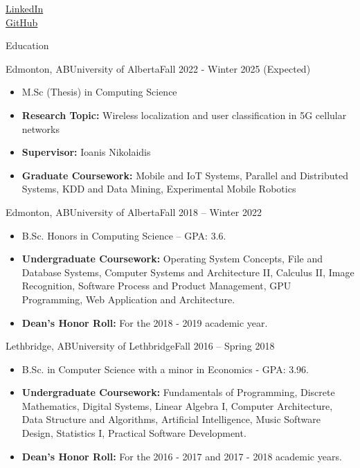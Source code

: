 \documentclass[]{mcdowellcv}
\begin{document}
\makeheader
\begin{flushright}
  \href{https://www.linkedin.com/in/jihoon-og-b938241a3/}{LinkedIn} \\
  \href{https://github.com/jihoonog}{GitHub}
\end{flushright}

\begin{cvsection}{Education}
  \begin{cvsubsection}{Edmonton, AB}{University of Alberta}{Fall 2022 - Winter 2025 (Expected)}
    \begin{itemize}
      \item M.Sc (Thesis) in Computing Science
      \item \textbf{Research Topic:} Wireless localization and user classification in 5G cellular networks
      \item \textbf{Supervisor:} Ioanis Nikolaidis 
      \item \textbf{Graduate Coursework:} Mobile and IoT Systems, Parallel and Distributed Systems, KDD and Data Mining, Experimental Mobile Robotics
    \end{itemize}
  \end{cvsubsection}
  \begin{cvsubsection}{Edmonton, AB}{University of Alberta}{Fall 2018 -- Winter 2022}
    \begin{itemize}
      \item B.Sc. Honors in Computing Science -- GPA: 3.6.
      \item \textbf{Undergraduate Coursework:} Operating System Concepts, File and Database Systems,
        Computer Systems and Architecture II, Calculus II, Image Recognition, Software Process and Product Management, GPU Programming,
        Web Application and Architecture.
      \item \textbf{Dean's Honor Roll:} For the 2018 - 2019 academic year. 
    \end{itemize}
  \end{cvsubsection}

  \begin{cvsubsection}{Lethbridge, AB}{University of Lethbridge}{Fall 2016 -- Spring 2018}
    \begin{itemize}   
      \item B.Sc. in Computer Science with a minor in Economics - GPA: 3.96.
      \item \textbf{Undergraduate Coursework:} Fundamentals of Programming, Discrete Mathematics, 
        Digital Systems, Linear Algebra I, Computer Architecture, Data Structure and Algorithms, 
        Artificial Intelligence, Music Software Design, Statistics I, Practical Software Development.
      \item \textbf{Dean's Honor Roll:} For the 2016 - 2017 and 2017 - 2018 academic years.
    \end{itemize}
  \end{cvsubsection}
\end{cvsection}
\end{document}
